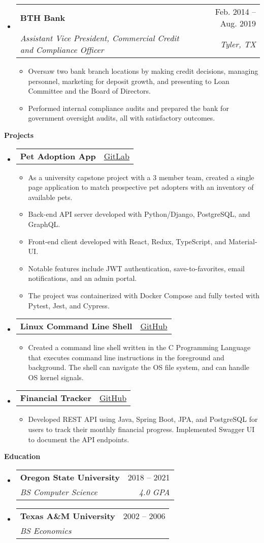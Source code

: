 \documentclass[letterpaper,12pt]{article}[leftmargin=*]
\makeatletter
\def \projectatext {GitLab}
\def \projectalink {https://gitlab.com/marc.clinedinst/osu-cs-467}
\def \projectbtext {GitHub}
\def \projectblink {https://github.com/robertjonesdev/CS344-Small-Linux-Shell}
\def \projectctext {GitHub}
\def \projectclink {https://github.com/robertjonesdev/FinancialTracker-SpringBoot}
\def \entryspacing {-0pt}
\def \projecta {\href{\projectalink}{\projectatext}}
\def \projectb {\href{\projectblink}{\projectbtext}}
\def \projectc {\href{\projectclink}{\projectctext}}
\renewcommand{\section}[2]{\vspace{5pt}
  \colorbox{secondary}{\color{white}\raggedbottom\normalsize\textbf{{#1}{\hspace{7pt}#2}}}
}
\newcommand{\resumeEntryStart}{\begin{itemize}[leftmargin=2.5mm]}
\newcommand{\resumeEntryEnd}{\end{itemize}\vspace{\entryspacing}}
\newcommand{\resumeItemListStart}{\begin{itemize}[leftmargin=4.5mm]}
\newcommand{\resumeItemListEnd}{\end{itemize}}
\newcommand{\resumeItem}[1]{
  \item\small{
    {#1 \vspace{-2pt}}
  }
}
\newcommand{\resumeEntryTSDL}[4]{
  \vspace{-1pt}\item[]
    \begin{tabularx}{0.97\textwidth}{X@{\hspace{60pt}}r}
      \textbf{\color{primary}#1} & {\firabook\color{accent}\small#2} \\
      \textit{\color{accent}\small#3} & \textit{\color{accent}\small#4} \\
    \end{tabularx}\vspace{-6pt}
}
\newcommand{\resumeEntryTD}[2]{
  \vspace{-1pt}\item[]
    \begin{tabularx}{0.97\textwidth}{X@{\hspace{60pt}}r}
      \textbf{\color{primary}#1} & {\firabook\color{accent}\small#2} \\
    \end{tabularx}\vspace{-6pt}
}
\makeatother
\begin{document}
  \resumeEntryStart
    \resumeEntryTSDL
      {BTH Bank}{Feb. 2014 -- Aug. 2019}
      {Assistant Vice President, Commercial Credit and Compliance Officer}{Tyler, TX}
    \resumeItemListStart
        \resumeItem {Oversaw two bank branch locations by making credit decisions, managing personnel, marketing for deposit growth, and presenting to Loan Committee and the Board of Directors.}
        \resumeItem {Performed internal compliance audits and prepared the bank for government oversight audits, all with satisfactory outcomes.}
    \resumeItemListEnd
  \resumeEntryEnd

\section{\faFlask}{Projects}

  \resumeEntryStart
    \resumeEntryTD
      {Pet Adoption App}{\projecta}
    \resumeItemListStart
      \resumeItem {As a university capstone project with a 3 member team, created a single page application to match prospective pet adopters with an inventory of available pets.}
      \resumeItem {Back-end API server developed with Python/Django, PostgreSQL, and GraphQL.}
      \resumeItem {Front-end client developed with React, Redux, TypeScript, and Material-UI.}
      \resumeItem {Notable features include JWT authentication, save-to-favorites, email notifications, and an admin portal.}
      \resumeItem {The project was containerized with Docker Compose and fully tested with Pytest, Jest, and Cypress.}
    \resumeItemListEnd
  \resumeEntryEnd

  \resumeEntryStart
    \resumeEntryTD
      {Linux Command Line Shell}{\projectb}
    \resumeItemListStart
      \resumeItem {Created a command line shell written in the C Programming Language that executes command line instructions in the foreground and background. The shell can navigate the OS file system, and can handle OS kernel signals.}
    \resumeItemListEnd
  \resumeEntryEnd

  \resumeEntryStart
    \resumeEntryTD
      {Financial Tracker}{\projectc}
    \resumeItemListStart
      \resumeItem {Developed REST API using Java, Spring Boot, JPA, and PostgreSQL for users to track their monthly financial progress. Implemented Swagger UI to document the API endpoints.}
    \resumeItemListEnd
  \resumeEntryEnd


\section{\faGraduationCap}{Education}

  \resumeEntryStart
    \resumeEntryTSDL
      {Oregon State University}{2018 -- 2021}
      {BS Computer Science}{4.0 GPA}
  \resumeEntryEnd

  \resumeEntryStart
    \resumeEntryTSDL
      {Texas A\&M University}{2002 -- 2006}
      {BS Economics}{ }
  \resumeEntryEnd
\end{document}
